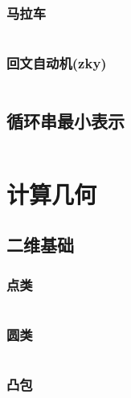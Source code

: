 \documentclass[landscape, twoside, a4paper]{article}
\newcommand{\cppcode}[1]{
	\inputminted[mathescape,
	frame=lines,linenos]{cpp}{source/#1}
}
\begin{document}
\begin{multicols}{2}
\begin{spacing}{0.8}
\subsubsection{马拉车}

\cppcode{string-manipulation/Manacher.cpp}



\subsubsection{回文自动机(zky)}

\cppcode{string-manipulation/PAM.cpp}





\subsection{循环串最小表示}

\cppcode{string-manipulation/minexpress.cpp}


\section{计算几何}


\subsection{二维基础}


\subsubsection{点类}
\cppcode{computational-geometry/point.cpp}


\subsubsection{圆类}
\cppcode{computational-geometry/circle.cpp}

\subsubsection{凸包}


\cppcode{computational-geometry/convex-hull.cpp}



\end{spacing}
\end{multicols}
\end{document}
